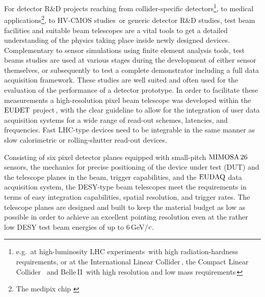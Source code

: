

For detector R\&D projects reaching from collider-specific detectors\footnote{e.g.~at high-luminosity LHC experiments\,\cite{Nurnberg:2014aya, Garcia-Argos:2015zda} with high radiation-hardness requirements,
 or at the International Linear Collider\,\cite{ILC}, the Compact Linear Collider \,\cite{CLIC} and Belle\,II\,\cite{Belle} with high resolution and low mass requirements\,\cite{MAPS}}, %
  to medical applications\footnote{The medipix chip \cite{medi}}, to HV-CMOS studies\,\cite{HV-CMOS} or generic detector R\&D studies,
  test beam facilities and suitable beam telescopes are a vital tools to get a detailed understanding of the physics taking place inside newly designed devices. 
Complementary to sensor simulations using finite element analysis tools, test beams studies are used at various stages during the development of either sensor themselves,
 or subsequently to test a complete demonstrator including a full data acquisition framework. 
These studies are well suited and often used for the evaluation of the performance of a detector prototype. %
In order to facilitate these measurements a high-resolution pixel beam telescope was developed within the $\textrm{EUDET}$ project\,\cite{ref:eudetreport200902},
 with the clear guideline to allow for the integration of user data acquisition systems for a wide range of read-out schemes, latencies, and frequencies. 
Fast LHC-type devices need to be integrable in the same manner as slow calorimetric or rolling-shutter read-out devices. 

Consisting of six pixel detector planes equipped with small-pitch $\textrm{MIMOSA\,26}$ sensors,
 the mechanics for precise positioning of the device under test (DUT) and the telescope planes in the beam, trigger capabilities, and the $\textrm{EUDAQ}$ data acquisition system, 
 the DESY-type beam telescopes meet the requirements in terms of easy integration capabilities, spatial resolution, and trigger rates. 
The telescope planes are designed and built to keep the material budget as low as possible in order to achieve an excellent pointing resolution
 even at the rather low DESY test beam energies of up to 6\,GeV/$\mathnormal{c}$.

